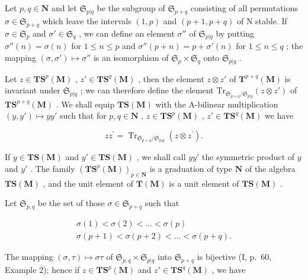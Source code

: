 Let \(p, q \in \mathbf{N}\) and let \(\mathfrak{S}_{p|q}\) be the subgroup of \(\mathfrak{S}_{p+q}\) consisting of all permutations \(\sigma \in \mathfrak{S}_{p+q}\) which leave the intervals \((1, p)\) and \((p+1, p+q)\) of N stable. If \(\sigma \in \mathfrak{S}_p\) and \(\sigma' \in \mathfrak{S}_q\) , we can define an element \(\sigma''\) of \(\mathfrak{S}_{p|q}\) by putting \(\sigma''(n) = \sigma(n)\) for \(1 \leqslant n \leqslant p\) and \(\sigma''(p+n) = p + \sigma'(n)\) for \(1 \leqslant n \leqslant q\) ; the mapping \((\sigma, \sigma') \mapsto \sigma''\) is an isomorphism of \(\mathfrak{S}_p \times \mathfrak{S}_q\) onto \(\mathfrak{S}_{p|q}\) .

Let \(z \in \mathbf{TS}^p(\mathbf{M})\) , \(z' \in \mathbf{TS}^q(\mathbf{M})\) , then the element \(z \otimes z'\) of \(\mathbf{T}^{p + q}(\mathbf{M})\) is invariant under \(\mathfrak{S}_{p|q}\) ; we can therefore define the element \(\mathrm{Tr}_{\mathfrak{S}_{p + q}/\mathfrak{S}_{p|q}}(z \otimes z')\) of \(\mathbf{TS}^{p + q}(\mathbf{M})\) . We shall equip \(\mathbf{TS}(\mathbf{M})\) with the A-bilinear multiplication \((y, y') \mapsto yy'\) such that for \(p, q \in \mathbf{N}\) , \(z \in \mathbf{TS}^p(\mathbf{M})\) , \(z' \in \mathbf{TS}^q(\mathbf{M})\) we have

\[
z z ^ {\prime} = \operatorname{Tr} _ {\mathfrak {S} _ {p + q} / \mathfrak {S} _ {p | q}} (z \otimes z ^ {\prime}).\tag{4}
\]

If \(y \in \mathbf{TS}(\mathbf{M})\) and \(y' \in \mathbf{TS}(\mathbf{M})\) , we shall call \(yy'\) the symmetric product of \(y\) and \(y'\) . The family \((\mathbf{TS}^p(\mathbf{M}))_{p \in \mathbf{N}}\) is a graduation of type \(\mathbf{N}\) of the algebra \(\mathbf{TS}(\mathbf{M})\) , and the unit element of \(\mathbf{T}(\mathbf{M})\) is a unit element of \(\mathbf{TS}(\mathbf{M})\) .

Let \(\mathfrak{S}_{p,q}\) be the set of those \(\sigma \in \mathfrak{S}_{p + q}\) such that

\[
\begin{array}{l} \sigma (1) <   \sigma (2) <   \ldots <   \sigma (p) \\ \sigma (p + 1) <   \sigma (p + 2) <   \ldots <   \sigma (p + q). \end{array}
\]

The mapping \((\sigma, \tau) \mapsto \sigma \tau\) of \(\mathfrak{S}_{p,q} \times \mathfrak{S}_{p|q}\) into \(\mathfrak{S}_{p+q}\) is bijective (I, p.~60, Example 2); hence if \(z \in \mathbf{T}\mathbf{S}^p(\mathbf{M})\) and \(z' \in \mathbf{T}\mathbf{S}^q(\mathbf{M})\) , we have

